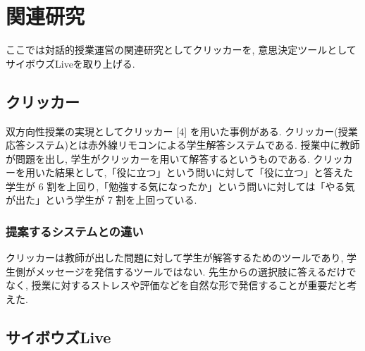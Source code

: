 \documentclass{funthesis}
\begin{document}

\chapter{関連研究}
ここでは対話的授業運営の関連研究としてクリッカーを, 意思決定ツールとしてサイボウズLiveを取り上げる.

\section{クリッカー\cite{A2} }
双方向性授業の実現としてクリッカー [4] を用いた事例がある. クリッカー(授業応答システム)とは赤外線リモコンによる学生解答システムである. 授業中に教師が問題を出し, 学生がクリッカーを用いて解答するというものである. クリッカーを用いた結果として,「役に立つ」という問いに対して「役に立つ」と答えた学生が 6 割を上回り,「勉強する気になったか」という問いに対しては「やる気が出た」という学生が 7 割を上回っている.
\subsection{提案するシステムとの違い}
クリッカーは教師が出した問題に対して学生が解答するためのツールであり, 学生側がメッセージを発信するツールではない.  先生からの選択肢に答えるだけでなく, 授業に対するストレスや評価などを自然な形で発信することが重要だと考えた. 


\section{サイボウズLive \cite{A3} }


\end{document}
